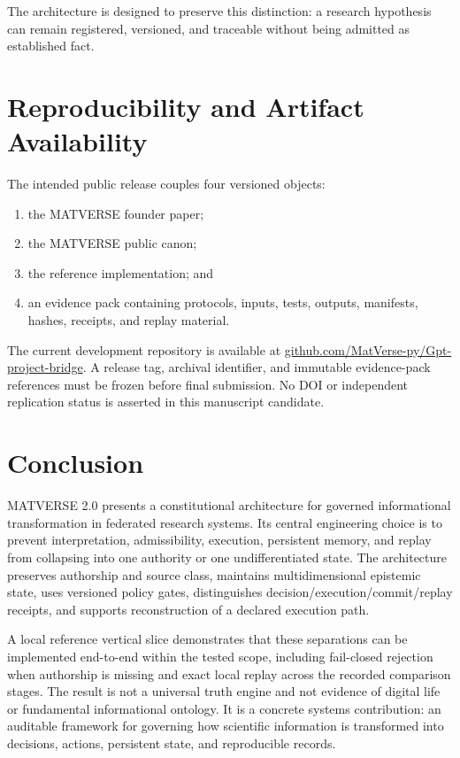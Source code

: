\documentclass[11pt]{article}
\begin{document}
The architecture is designed to preserve this distinction: a research hypothesis can remain registered, versioned, and traceable without being admitted as established fact.

\section{Reproducibility and Artifact Availability}

The intended public release couples four versioned objects:

\begin{enumerate}
  \item the MATVERSE founder paper;
  \item the MATVERSE public canon;
  \item the reference implementation; and
  \item an evidence pack containing protocols, inputs, tests, outputs, manifests, hashes, receipts, and replay material.
\end{enumerate}

The current development repository is available at
\href{https://github.com/MatVerse-py/Gpt-project-bridge}{github.com/MatVerse-py/Gpt-project-bridge}.
A release tag, archival identifier, and immutable evidence-pack references must be frozen before final submission. No DOI or independent replication status is asserted in this manuscript candidate.

\section{Conclusion}

MATVERSE 2.0 presents a constitutional architecture for governed informational transformation in federated research systems. Its central engineering choice is to prevent interpretation, admissibility, execution, persistent memory, and replay from collapsing into one authority or one undifferentiated state. The architecture preserves authorship and source class, maintains multidimensional epistemic state, uses versioned policy gates, distinguishes decision/execution/commit/replay receipts, and supports reconstruction of a declared execution path.

A local reference vertical slice demonstrates that these separations can be implemented end-to-end within the tested scope, including fail-closed rejection when authorship is missing and exact local replay across the recorded comparison stages. The result is not a universal truth engine and not evidence of digital life or fundamental informational ontology. It is a concrete systems contribution: an auditable framework for governing how scientific information is transformed into decisions, actions, persistent state, and reproducible records.
\end{document}
